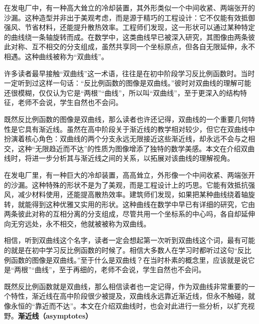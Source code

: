 
\begin{issues}
\issueDraft
\end{issues}


在发电厂中，有一种高大耸立的冷却装置，其外形类似一个中间收紧、两端张开的沙漏。这种造型并非出于美观考虑，而是源于精巧的工程设计：它不仅能有效抵御强风、节省材料，还能提升散热效率。工程师们发现，这一形状可以通过某种特定的曲线绕一条轴旋转而成。在数学中，这类曲线早已被深入研究，其图像由两条彼此对称、互不相交的分支组成，虽然共享同一个坐标原点，但各自无限延伸，永不相遇。这种曲线被称为“双曲线”。

许多读者最早接触“双曲线”这一术语，往往是在初中阶段学习反比例函数时。当时一定听到过这样一句话：“反比例函数的图像是双曲线。”彼时对双曲线的理解可能还很模糊，仅仅认为它是“两根”“曲线”，所以叫“双曲线”，至于更深入的结构特征，老师不会说，学生自然也不会问。

既然反比例函数的图像是双曲线，那么读者也许还记得，双曲线的一个重要几何特性是它具有渐近线。虽然在高中阶段关于渐近线的教学相对较少，但它在双曲线中扮演着核心角色：双曲线的两个分支永远无限接近这些渐近线，却永远不会与之相交，这种“无限趋近而不达”的性质为图像增添了独特的数学美感。本文在介绍双曲线时，将进一步分析其与渐近线之间的关系，以拓展对该曲线的理解视角。


在发电厂里，有一种巨大的冷却装置，高高耸立，外形像一个中间收紧、两端张开的沙漏。这种特殊的形状不是为了美观，而是工程设计上的巧思。它能有效抵抗强风，减少材料使用，还能提高散热效率。建筑师们发现，如果把某种曲线绕着轴旋转，就能得到这种优雅又实用的形状。这种曲线在数学中早已有详细的研究，它由两条彼此对称的互相分离的分支组成，尽管共用一个坐标系的中心吗，各自却延伸向无穷远处，永不相交，他就被被称为双曲线。

相信，听到双曲线这个名字，读者一定会想起第一次听到双曲线这个词，最有可能的就是在初中学习反比例函数的时候了。相信大多数人在学习时都听过这句“反比例函数的图像是双曲线。”至于什么是双曲线？在当时朴素的概念里，应该就是说它是“两根”“曲线”，至于再细的，老师不会说，学生自然也不会问。

既然反比例函数就是双曲线，那么相信读者也一定记得，作为双曲线非常重要的一个特性，渐近线在高中阶段很少被提及，双曲线永远靠近渐近线，但永不触碰，就像永恒的“靠近而不达”。本文在介绍双曲线时，也会对此进行一些分析，以扩充视野。\textbf{渐近线（asymptotes）}

